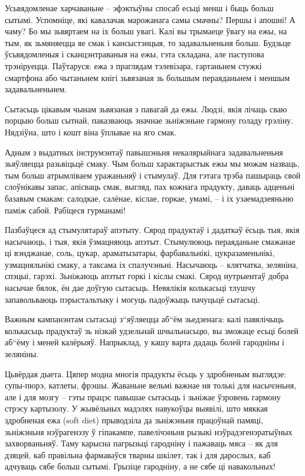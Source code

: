 Усьвядомленае харчаваньне – эфэктыўны спосаб есьці менш і быць больш сытымі. Успомніце, які кавалачак марожанага самы смачны? Першы і апошні! А чаму? Бо мы зьвяртаем на іх больш увагі. Калі вы трымаеце ўвагу на ежы, на тым, як зьмяняецца яе смак і кансыстэнцыя, то задавальненьня больш. Будзьце ўсьвядомленыя і сканцэнтраваныя на ежы, гэта складана, але паступова трэніруецца. Паўтаруся: ежа з праглядам тэлевізара, гартаньнем стужкі смартфона або чытаньнем кнігі зьвязаная зь большым пераяданьнем і меншым задавальненьнем.

Сытасьць цікавым чынам зьвязаная з павагай да ежы. Людзі, якія лічаць сваю порцыю больш сытнай, паказваюць значнае зьніжэньне гармону голаду грэліну. Нядзіўна, што і кошт віна ўплывае на яго смак.

Адным з выдатных інструмэнтаў павышэньня некалярыйнага задавальненьня зьяўляецца разьвіцьцё смаку. Чым больш характарыстык ежы мы можам назваць, тым больш атрымліваем уражаньняў і стымулаў. Для гэтага трэба пашыраць свой слоўнікавы запас, апісваць смак, выгляд, пах кожнага прадукту, даваць адценьні базавым смакам: салодкае, салёнае, кіслае, горкае, умамі, – і іх узаемадзеяньню паміж сабой. Рабіцеся гурманамі!

Пазбаўцеся ад стымулятараў апэтыту. Сярод прадуктаў і дадаткаў ёсьць тыя, якія насычаюць, і тыя, якія ўзмацняюць апэтыт. Стымулююць пераяданьне смажанае ці вэнджанае, соль, цукар, араматызатары, фарбавальнікі, цукразаменьнікі, узмацняльнікі смаку, а таксама іх спалучэньні. Насычаюць – клятчатка, зеляніна, спэцыі, гарэхі. Зьніжаюць апэтыт горкі і кіслы смакі. Сярод нутрыентаў добра насычае бялок, ён дае доўгую сытасьць. Невялікія колькасьці тлушчу запавольваюць пэрыстальтыку і могуць падоўжыць пачуцьцё сытасьці.

Важным кампанэнтам сытасьці з“яўляецца аб“ём зьедзенага: калі павялічыць колькасьць прадуктаў зь нізкай удзельнай шчыльнасьцю, вы зможаце есьці болей аб“ёму і меней калёрыяў. Напрыклад, у кашу варта дадаць болей гародніны і зеляніны.

Цьвёрдая дыета. Цяпер модна многія прадукты ёсьць у здробненым выглядзе: супы-пюрэ, катлеты, фрэшы. Жаваньне вельмі важнае ня толькі для насычэньня, але і для мозгу – гэты працэс павышае сытасьць і зьніжае ўзровень гармону стрэсу картызолу. У жывёльных мадэлях навукоўцы выявілі, што мяккая здробненая ежа (soft diet) прыводзіла да зьніжэньня працоўнай памяці, зьніжэньня нэўрагенэзу ў гіпакампе, павелічэньня рызыкі нэўрадэгенэратыўных захворваньняў. Таму карысна пагрызьці гародніну і пажаваць мяса – як для дзяцей, каб правільна фармаваўся тварны шкілет, так і для дарослых, каб адчуваць сябе больш сытымі. Грызіце гародніну, а не сябе ці навакольных!

